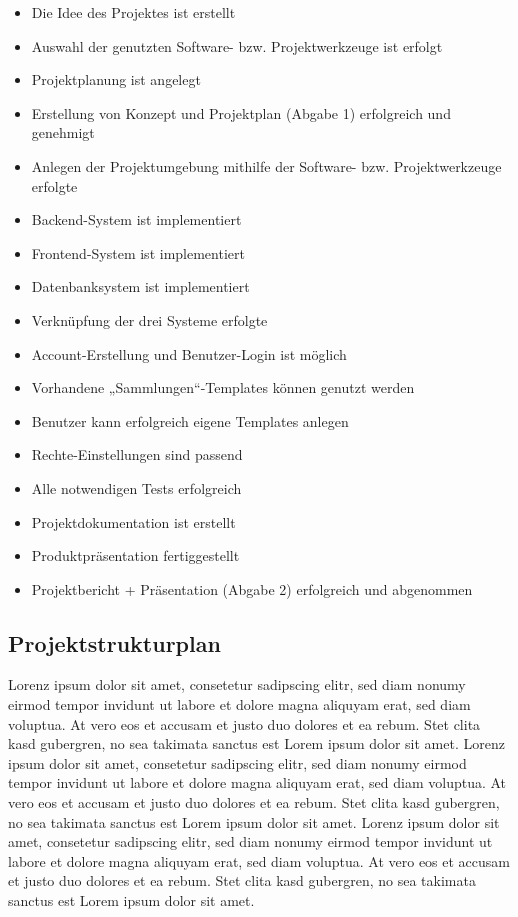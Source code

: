 \begin{itemize}[label=-, itemsep=0pt, parsep=0pt] %
\item Die Idee des Projektes ist erstellt
\item Auswahl der genutzten Software- bzw. Projektwerkzeuge ist erfolgt
\item Projektplanung ist angelegt
\item Erstellung von Konzept und Projektplan (Abgabe 1) erfolgreich und genehmigt
\item Anlegen der Projektumgebung mithilfe der Software- bzw. Projektwerkzeuge erfolgte
\item Backend-System ist implementiert
\item Frontend-System ist implementiert
\item Datenbanksystem ist implementiert
\item Verknüpfung der drei Systeme erfolgte
\item Account-Erstellung und Benutzer-Login ist möglich
\item Vorhandene „Sammlungen“-Templates können genutzt werden
\item Benutzer kann erfolgreich eigene Templates anlegen
\item Rechte-Einstellungen sind passend
\item Alle notwendigen Tests erfolgreich
\item Projektdokumentation ist erstellt
\item Produktpräsentation fertiggestellt
\item Projektbericht + Präsentation (Abgabe 2) erfolgreich und abgenommen
\end{itemize}


\subsection{Projektstrukturplan}\label{subsec:PSP}
Lorenz ipsum dolor sit amet, consetetur sadipscing elitr, sed diam nonumy eirmod tempor invidunt ut labore et dolore magna aliquyam erat, sed diam voluptua.
At vero eos et accusam et justo duo dolores et ea rebum.
Stet clita kasd gubergren, no sea takimata sanctus est Lorem ipsum dolor sit amet.
Lorenz ipsum dolor sit amet, consetetur sadipscing elitr, sed diam nonumy eirmod tempor invidunt ut labore et dolore magna aliquyam erat, sed diam voluptua.
At vero eos et accusam et justo duo dolores et ea rebum.
Stet clita kasd gubergren, no sea takimata sanctus est Lorem ipsum dolor sit amet.
Lorenz ipsum dolor sit amet, consetetur sadipscing elitr, sed diam nonumy eirmod tempor invidunt ut labore et dolore magna aliquyam erat, sed diam voluptua.
At vero eos et accusam et justo duo dolores et ea rebum.
Stet clita kasd gubergren, no sea takimata sanctus est Lorem ipsum dolor sit amet.

